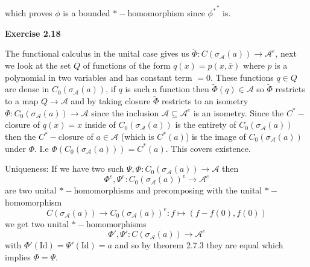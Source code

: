\documentclass{article}
\begin{document}
\begin{center}
\end{center}

which proves $\phi$ is a bounded $*-$homomorphism since ${\phi^*}^*$ is.

\vspace{0.5cm}

\textbf{Exercise 2.18}

\vspace{0.5cm}

The functional calculus in the unital case gives us $\tilde\Phi : C(\sigma_{\mathcal A}(a)) \rightarrow \mathcal A^e$, next we look at the set $Q$ of functions of the form $q(x) = p(x,\overline x)$ where $p$ is a polynomial in two variables and has constant term $ = 0$. These functions $q \in Q$ are dense in $C_0(\sigma_{\mathcal A}(a))$, if $q$ is such a function then $\tilde\Phi(q) \in \mathcal A$ so $\tilde\Phi$ restricts to a map $Q \rightarrow \mathcal A$ and by taking closure $\tilde \Phi$ restricts to an isometry $\Phi:C_0(\sigma_{\mathcal A}(a)) \rightarrow \mathcal A$ since the inclusion $\mathcal A \subseteq \mathcal A^e$ is an isometry. Since the $C^*-$closure of $q(x) = x$ inside of $C_0(\sigma_{\mathcal A}(a))$ is the entirety of $C_0(\sigma_{\mathcal A}(a))$ then the $C^*-$closure of $a \in \mathcal A$ (which is $C^*(a)$) is the image of $C_0(\sigma_{\mathcal A}(a))$ under $\Phi$. I.e $\Phi(C_0(\sigma_\mathcal A(a))) = C^*(a)$. This covers existence.

\vspace{0.3cm}

Uniqueness: If we have two such $\Psi,\Phi : C_0(\sigma_\mathcal A(a)) \rightarrow \mathcal A$ then 
$$\Phi^e, \Psi^e : C_0(\sigma_\mathcal A(a))^e \rightarrow \mathcal A^e$$ 
are two unital $*-$homomorphisms and precomposing with the unital $*-$homomorphism 
$$C(\sigma_\mathcal A(a)) \rightarrow C_0(\sigma_\mathcal A(a))^e: f \mapsto (f - f(0), f(0))$$ 
we get two unital $*-$homomorphisms 
$$\Phi', \Psi' : C(\sigma_\mathcal A(a)) \rightarrow \mathcal A^e$$ 
with $\Phi'(\text{Id}) = \Psi'(\text{Id}) = a$ and so by theorem 2.7.3 they are equal which implies $\Phi = \Psi$.

\vspace{0.5cm}
\end{document}
